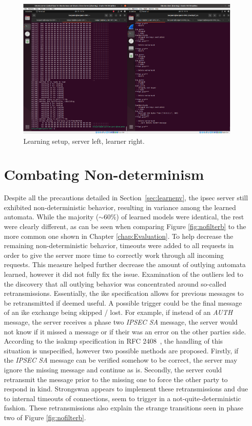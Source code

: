 \begin{figure}
	\centering
	\includegraphics[width=\linewidth]{images/VM_setup}
	\caption{Learning setup, server left, learner right.}
	\label{fig:vmsetup}
\end{figure}

\section{Combating Non-determinism} \label{subsec:nondet}
Despite all the precautions detailed in Section~\ref{sec:learnenv}, the \ac{ipsec} server still exhibited non-deterministic behavior, resulting in variance among the learned automata. While the majority ($\sim$60\%) of learned models were identical, the rest were clearly different, as can be seen when comparing Figure \ref{fig:nofilterb} to the more common one shown in Chapter \ref{chap:Evaluation}. To help decrease the remaining non-deterministic behavior, timeouts were added to all requests in order to give the server more time to correctly work through all incoming requests. This measure helped further decrease the amount of outlying automata learned, however it did not fully fix the issue. Examination of the outliers led to the discovery that all outlying behavior was concentrated around so-called retransmissions. Essentially, the \ac{ike} specification allows for previous messages to be retransmitted if deemed useful. A possible trigger could be the final message of an \ac{ike} exchange being skipped / lost. For example, if instead of an \emph{AUTH} message, the server receives a phase two \emph{IPSEC SA} message, the server would not know if it missed a message or if their was an error on the other parties side. According to the \ac{isakmp} specification in RFC 2408~\parencite{rfc2408}, the handling of this situation is unspecified, however two possible methods are proposed. Firstly, if the \emph{IPSEC SA} message can be verified somehow to be correct, the server may ignore the missing message and continue as is. Secondly, the server could retransmit the message prior to the missing one to force the other party to respond in kind. Strongswan appears to implement these retransmissions and due to internal timeouts of connections, seem to trigger in a not-quite-deterministic fashion. These retransmissions also explain the strange transitions seen in phase two of Figure \ref{fig:nofilterb}. 

